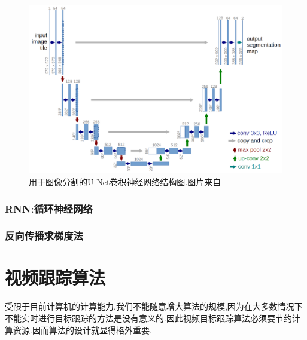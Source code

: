 \par
\begin{figure}[htbp!]
    \centering
    \includegraphics[width = 1.\textwidth]{chap/img/u-net-architecture.png}
    \caption{
        用于图像分割的U-Net\supercite{ronneberger2015u}卷积神经网络结构图.图片来自
        }\label{fig:unet_architecture}
\end{figure}
\par


\subsubsection{RNN:循环神经网络}
\subsubsection{反向传播求梯度法}

\section{视频跟踪算法}
受限于目前计算机的计算能力,我们不能随意增大算法的规模,因为在大多数情况下不能实时进行目标跟踪的方法是没有意义的.因此视频目标跟踪算法必须要节约计算资源.因而算法的设计就显得格外重要.
